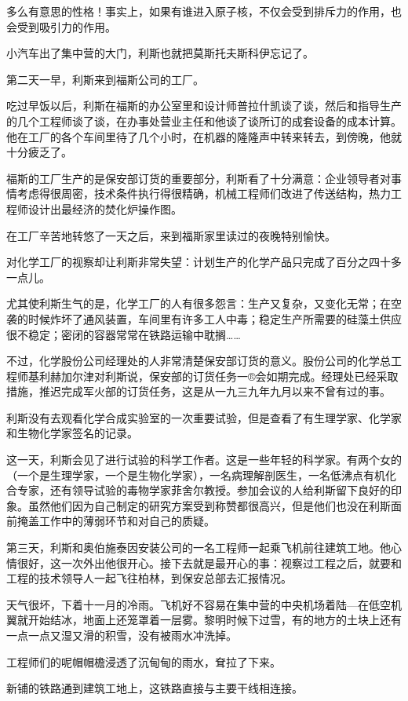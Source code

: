 多么有意思的性格！事实上，如果有谁进入原子核，不仅会受到排斥力的作用，也会受到吸引力的作用。

小汽车出了集中营的大门，利斯也就把莫斯托夫斯科伊忘记了。

第二天一早，利斯来到福斯公司的工厂。

吃过早饭以后，利斯在福斯的办公室里和设计师普拉什凯谈了谈，然后和指导生产的几个工程师谈了谈，在办事处营业主任和他谈了谈所订的成套设备的成本计算。他在工厂的各个车间里待了几个小时，在机器的隆隆声中转来转去，到傍晚，他就十分疲乏了。

福斯的工厂生产的是保安部订货的重要部分，利斯看了十分满意：企业领导者对事情考虑得很周密，技术条件执行得很精确，机械工程师们改进了传送结构，热力工程师设计出最经济的焚化炉操作图。

在工厂辛苦地转悠了一天之后，来到福斯家里读过的夜晚特别愉快。

对化学工厂的视察却让利斯非常失望：计划生产的化学产品只完成了百分之四十多一点儿。

尤其使利斯生气的是，化学工厂的人有很多怨言：生产又复杂，又变化无常；在空袭的时候炸坏了通风装置，车间里有许多工人中毒；稳定生产所需要的硅藻土供应很不稳定；密闭的容器常常在铁路运输中耽搁……

不过，化学股份公司经理处的人非常清楚保安部订货的意义。股份公司的化学总工程师基利赫加尔津对利斯说，保安部的订货任务一®会如期完成。经理处已经采取措施，推迟完成军火部的订货任务，这是从一九三九年九月以来不曾有过的事。

利斯没有去观看化学合成实验室的一次重要试验，但是查看了有生理学家、化学家和生物化学家签名的记录。

这一天，利斯会见了进行试验的科学工作者。这是一些年轻的科学家。有两个女的（一个是生理学家，一个是生物化学家），一名病理解剖医生，一名低沸点有机化合专家，还有领导试验的毒物学家菲舍尔教授。参加会议的人给利斯留下良好的印象。虽然他们因为自己制定的研究方案受到称赞都很高兴，但是他们也没在利斯面前掩盖工作中的薄弱环节和对自己的质疑。

第三天，利斯和奥伯施泰因安装公司的一名工程师一起乘飞机前往建筑工地。他心情很好，这一次外出他很开心。接下去就是最开心的事：视察过工程之后，就要和工程的技术领导人一起飞往柏林，到保安总部去汇报情况。

天气很坏，下着十一月的冷雨。飞机好不容易在集中营的中央机场着陆—在低空机翼就开始结冰，地面上还笼罩着一层雾。黎明时候下过雪，有的地方的土块上还有一点一点又湿又滑的积雪，没有被雨水冲洗掉。

工程师们的呢帽帽檐浸透了沉甸甸的雨水，耷拉了下来。

新铺的铁路通到建筑工地上，这铁路直接与主要干线相连接。

